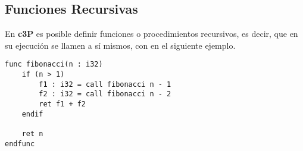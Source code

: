 \subsection{Funciones Recursivas}

En \textbf{c3P} es posible definir funciones o procedimientos recursivos,
es decir, que en su ejecución se llamen a sí mismos, con en el siguiente ejemplo.

\begin{verbatim}
func fibonacci(n : i32)
    if (n > 1)
        f1 : i32 = call fibonacci n - 1
        f2 : i32 = call fibonacci n - 2
        ret f1 + f2
    endif
    
    ret n
endfunc
\end{verbatim}